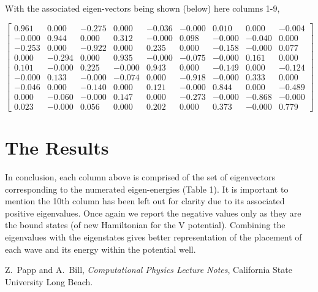 \documentclass[12pt,letterpaper,notitlepage]{article}
\begin{document}
With the associated eigen-vectors being shown (below) here columns 1-9, 
\begin{center}
	$
	\begin{bmatrix}
	   0.961	& 0.000	& -0.275	& 0.000	& -0.036	& -0.000	& 0.010	& 0.000	& -0.004 \\
	  -0.000	& 0.944	& 0.000	& 0.312	& -0.000	& 0.098	& -0.000	& -0.040	& 0.000 \\
	  -0.253	& 0.000	& -0.922	& 0.000	& 0.235	& 0.000	& -0.158	& -0.000	& 0.077\\
	   0.000	& -0.294	& 0.000	& 0.935	& -0.000	& -0.075	& -0.000	& 0.161	& 0.000\\
	   0.101	& -0.000	& 0.225	& -0.000	& 0.943	& 0.000	& -0.149	& 0.000	& -0.124\\
	  -0.000	& 0.133	& -0.000	& -0.074	& 0.000	& -0.918	& -0.000	& 0.333	& 0.000\\
	  -0.046	& 0.000	& -0.140	& 0.000	& 0.121	& -0.000	& 0.844	& 0.000	& -0.489\\
	   0.000	& -0.060	& -0.000	& 0.147	& 0.000	& -0.273	& -0.000	& -0.868	& -0.000\\
	   0.023	& -0.000	& 0.056	& 0.000	& 0.202	& 0.000	& 0.373	& -0.000 	& 0.779
	\end{bmatrix}
	$	
\end{center}

\section{The Results}

In conclusion, each column above is comprised of the set of eigenvectors corresponding to the numerated eigen-energies (Table 1). It is important to mention the 10th column has been left out for clarity due to its associated positive eigenvalues. Once again we report the negative values only as they are the bound states (of new Hamiltonian for the V potential). Combining the eigenvalues with the eigenstates gives better representation of the placement of each wave and its energy within the potential well.
      
\begin{thebibliography}{}

	\bibitem{}
	Z.~Papp and A.~Bill, {\it Computational Physics Lecture Notes}, California State University Long Beach.
	
\end{thebibliography}
\end{document}
